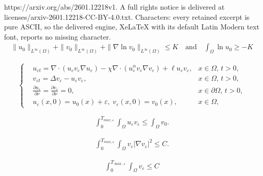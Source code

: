 \documentclass[10pt,a4paper]{amsart}
\begin{document}
https://arxiv.org/abs/2601.12218v1. A full rights notice is delivered at licenses/arxiv-2601.12218-CC-BY-4.0.txt. Characters: every retained excerpt is pure ASCII, so the delivered engine, XeLaTeX with its default Latin Modern text font, reports no missing character.
\begin{align}\label{1.6}
    \|u_0\|_{L^{\infty}(\Omega)}+\|v_0\|_{L^{\infty}(\Omega)}+\|\nabla \ln v_0\|_{L^{\infty}(\Omega)}\leq K\quad \text{and}\quad \int_{\Omega}\ln{u_0}\geq -K
\end{align}

\begin{equation}\label{2.5}
\left\{
\begin{aligned}
&u_{\varepsilon t}=\nabla \cdot (u_{\varepsilon}v_{\varepsilon}\nabla u_{\varepsilon})-\chi \nabla \cdot
(u^{\alpha}_{\varepsilon}v_{\varepsilon}\nabla v_{\varepsilon})+\ell u_{\varepsilon}v_{\varepsilon},&x\in \Omega,\, t>0,\\
& v_{\varepsilon t}=\Delta v_{\varepsilon}-u_{\varepsilon}v_{\varepsilon},&x\in \Omega,\, t>0,\\
& \frac{\partial u_{\varepsilon }}{\partial \nu}=\frac{\partial v_{\varepsilon }}{\partial \nu}=0,&x\in \partial\Omega,\, t>0,\\
& u_{\varepsilon }(x,0)=u_0(x)+\varepsilon,\;v_{\varepsilon }(x,0)=v_0(x),&x\in \Omega,\,
\end{aligned}
\right.
\end{equation}

\begin{align}\label{2.10}
    \int_{0}^{T_{max,\varepsilon}}\int_{\Omega}u_{\varepsilon }v_{\varepsilon }\leq \int_{\Omega}v_{0}.
\end{align}

\begin{align}\label{2.11}
    \int_0^{T_{max,\varepsilon}}\int_{\Omega}v_{\varepsilon}|\nabla v_{\varepsilon}|^2\leq C.
\end{align}

\begin{align}\label{2.18}
\int_0^{T_{\max, \varepsilon}}\int_{\Omega}v_{\varepsilon}\leq C
\end{align}
\end{document}
